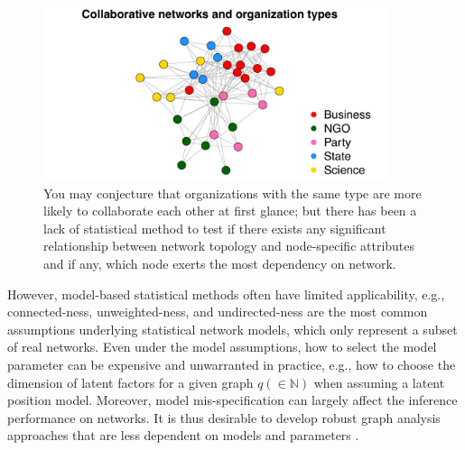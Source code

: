 \documentclass[11pt]{article}
\theoremstyle{definition}
\begin{document}
\begin{figure}[h]
	\centering
	\includegraphics[width=4in]{introplot.pdf}	
	\caption{You may conjecture that organizations with the same type are more likely to collaborate each other at first glance; but there has been a lack of statistical method to test if there exists any significant relationship between network topology and node-specific attributes and if any, which node exerts the most dependency on network.}
	\label{fig:intro}
\end{figure}

However, model-based statistical methods often have limited applicability, e.g., connected-ness, unweighted-ness, and undirected-ness are the most common assumptions underlying statistical network models, which only represent a subset of real networks. Even under the model assumptions, how to select the model parameter can be expensive and unwarranted in practice, e.g., how to choose the dimension of latent factors for a given graph $q (\in \mathbb{N})$ when assuming a latent position model. Moreover, model mis-specification can largely affect the inference performance on networks. It is thus desirable to develop robust graph analysis approaches that are less dependent on models and parameters \cite{ChenShenVogelsteinPriebe2016}.
\end{document}
